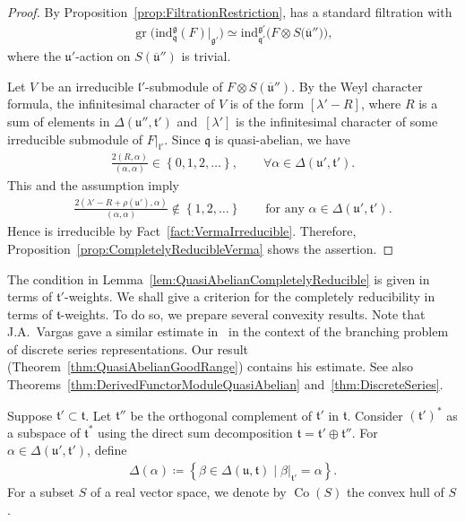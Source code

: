 \documentclass[pdftex]{sigma}
\numberwithin{equation}{section}
\theoremstyle{definition}
\newcommand{\set}[1]{\left\{#1 \right\}}
\DeclareMathOperator{\gr}{gr}
\newcommand{\lieC}[1]{\mathfrak{#1}}
\newcommand{\lie}[1]{\mathfrak{#1}}
\newcommand{\ind}[2]{\mathrm{ind}^{\lieC{#1}}_{\lieC{#2}}}
\DeclareMathOperator{\Co}{\mathrm{Co}}
\begin{document}
\begin{proof}
	By Proposition~\ref{prop:FiltrationRestriction}, \smash{$\ind{g}{q}(F)|_{\lie{g}'}$} has a standard filtration with
	\begin{align*}
		\gr\bigl(\ind{g}{q}(F)|_{\lie{g}'}\bigr) \simeq \ind{g'}{q'}\bigl(F\otimes S\bigl(\lie{\overline{u}}''\bigr)\bigr),
	\end{align*}
	where the $\lie{u}'$-action on $S(\lie{\overline{u}}'')$ is trivial.

	Let $V$ be an irreducible $\lie{l'}$-submodule of $F\otimes S(\lie{\overline{u}}'')$.
	By the Weyl character formula, the infinitesimal character of $V$ is of the form $[\lambda' - R]$,
	where $R$ is a sum of elements in $\Delta(\lie{u''}, \lie{t'})$ and~$[\lambda']$ is the infinitesimal character of some irreducible submodule of $F|_{\lie{l'}}$.
	Since $\lie{q}$ is quasi-abelian, we have
	\begin{align*}
		\frac{2(R, \alpha)}{(\alpha, \alpha)} \in \set{0, 1, 2, \ldots}, \qquad \forall \alpha \in \Delta(\lie{u'}, \lie{t'}).
	\end{align*}
	This and the assumption imply
	\begin{align*}
		\frac{2(\lambda'-R+\rho(\lie{u}'), \alpha)}{(\alpha, \alpha)} \not \in \set{1, 2, \ldots}\qquad \text{for any }\alpha \in \Delta(\lie{u'}, \lie{t'}).
	\end{align*}
	Hence \smash{$\ind{g'}{q'}(V)$} is irreducible by Fact~\ref{fact:VermaIrreducible}.
	Therefore, Proposition~\ref{prop:CompletelyReducibleVerma} shows the assertion.
\end{proof}

The condition in Lemma~\ref{lem:QuasiAbelianCompletelyReducible} is given in terms of $\lie{t'}$-weights.
We shall give a criterion for the completely reducibility in terms of $\lie{t}$-weights.
To do so, we prepare several convexity results.
Note that J.A.~Vargas gave a similar estimate in~\cite[\S(1.5)]{Va16} in the context of the branching problem of discrete series representations.
Our result (Theorem~\ref{thm:QuasiAbelianGoodRange}) contains his estimate.
See also Theorems~\ref{thm:DerivedFunctorModuleQuasiAbelian} and~\ref{thm:DiscreteSeries}.

Suppose $\lie{t'}\subset \lie{t}$.
Let $\lie{t}''$ be the orthogonal complement of $\lie{t}'$ in $\lie{t}$.
Consider $(\lie{t'})^*$ as a subspace of $\lie{t}^*$
using the direct sum decomposition $\lie{t}=\lie{t'} \oplus \lie{t''}$.
For $\alpha \in \Delta(\lie{u'}, \lie{t'})$, define
\begin{align*}
	\Delta(\alpha)\coloneq \set{\beta \in \Delta(\lie{u}, \lie{t})\mid \beta|_{\lie{t}'}=\alpha}.
\end{align*}
For a subset $S$ of a real vector space, we denote by $\Co(S)$ the convex hull of $S$.
\end{document}
